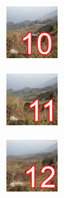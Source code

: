 \begin{code}
\begin{gridlayout}{\textwidth}{12cm}
\begin{row}{0.34}
\begin{cell}{0.25}
                \centering
                \includegraphics[width=0.9\cellwidth]{doc-one/img/thumbnail-10.png}
            \end{cell}
            \begin{cell}{0.25}
                \centering
                \includegraphics[width=0.9\cellwidth]{doc-one/img/thumbnail-11.png}
            \end{cell}
            \begin{cell}{0.25}
                \centering
                \includegraphics[width=0.9\cellwidth]{doc-one/img/thumbnail-12.png}
            \end{cell}
        \end{row}
    \end{gridlayout}
\end{code}

\newpage







\tasktwelve

